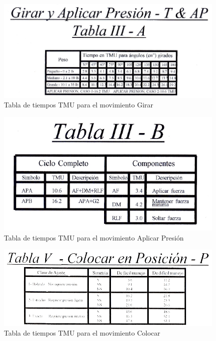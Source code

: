 \begin{figure}[H]
        \centering
        \includegraphics[trim = {0mm 0mm 0mm 0mm},clip,scale=0.2]{10/Img/tabla3A.png}
        \caption{Tabla de tiempos TMU para el movimiento Girar}
        \label{tabla3A}
\end{figure}

\begin{figure}[H]
        \centering
        \includegraphics[trim = {0mm 0mm 0mm 0mm},clip,scale=0.2]{10/Img/tabla3B.png}
        \caption{Tabla de tiempos TMU para el movimiento Aplicar Presión}
        \label{tabla3B}
\end{figure}

\begin{figure}[H]
        \centering
        \includegraphics[trim = {0mm 0mm 0mm 0mm},clip,scale=0.2]{10/Img/tabla5.png}
        \caption{Tabla de tiempos TMU para el movimiento Colocar}
        \label{tabla5}
\end{figure}

